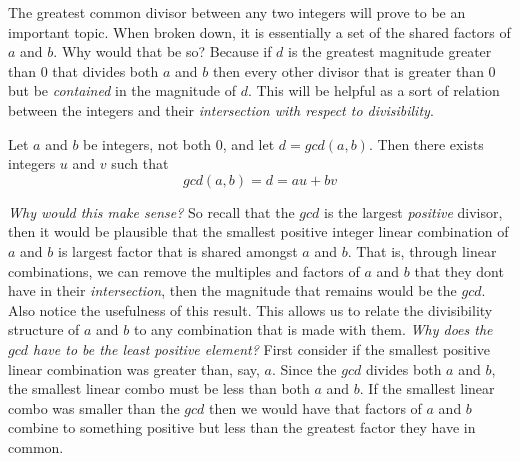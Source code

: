 \documentclass[../main.tex]{subfiles}
\begin{document}
\begin{remark}
    The greatest common divisor between any two integers will prove to be an important topic. When broken down, it is essentially a set of the shared factors of \(a\) and \(b\). Why would that be so? Because if \(d\) is the greatest magnitude greater than \(0\) that divides both \(a\) and \(b\) then every other divisor that is greater than 0 but be \textit{contained} in the magnitude of \(d\). This will be helpful as a sort of relation between the integers and their \textit{intersection with respect to divisibility}.
\end{remark}



















\begin{theorem}\label{thm:bezout_identity}
Let \(a\) and \(b\) be integers, not both 0, and let \(d = gcd(a,b)\). Then there exists integers \(u\) and \(v\) such that \[
gcd(a,b) = d = au + bv
\]  
\end{theorem}

\begin{remark}
\textit{Why would this make sense?} So recall that the \(gcd\) is the largest \textit{positive} divisor, then it would be plausible that the smallest positive integer linear combination of \(a\) and \(b\) is largest factor that is shared amongst \(a\) and \(b\). That is, through linear combinations, we can remove the multiples and factors of \(a\) and \(b\) that they dont have in their \textit{intersection}, then the magnitude that remains would be the \(gcd\). Also notice the usefulness of this result. This allows us to relate the divisibility structure of \(a\) and \(b\) to any combination that is made with them. \textit{Why does the \(gcd\) have to be the least positive element?} First consider if the smallest positive linear combination was greater than, say, \(a\). Since the \(gcd\) divides both \(a\) and \(b\),  the smallest linear combo must be less than both \(a \) and \(b\). If the smallest linear combo was smaller than the \(gcd\) then we would have that factors of \(a\) and \(b\) combine to something positive but less than the greatest factor they have in common. 
\end{remark}
\end{document}
